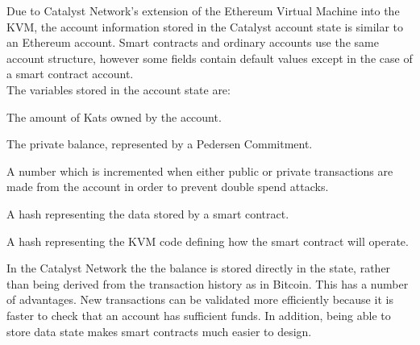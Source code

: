 Due to Catalyst Network’s extension of the Ethereum Virtual Machine into the KVM, the account information stored in the Catalyst account state is similar to an Ethereum account. Smart contracts and ordinary accounts use the same account structure, however some fields contain default values except in the case of a smart contract account. \\

The variables stored in the account state are:

\begin{description}[labelwidth=2cm, leftmargin=!]
\item [Balance] The amount of Kats owned by the account.
\item [Commitment] The private balance, represented by a Pedersen Commitment.
\item [Nonce] A number which is incremented when either public or private transactions are made from the account in order to prevent double spend attacks.
\item [StorageRoot] A hash representing the data stored by a smart contract.
\item [CodeHash] A hash representing the KVM code defining how the smart contract will operate.
\end{description}
\vspace{0.75em}
In the Catalyst Network the the balance is stored directly in the state, rather than being derived from the transaction history as in Bitcoin. This has a number of advantages. New transactions can be validated more efficiently because it is faster to check that an account has sufficient funds. In addition, being able to store data state makes smart contracts much easier to design.